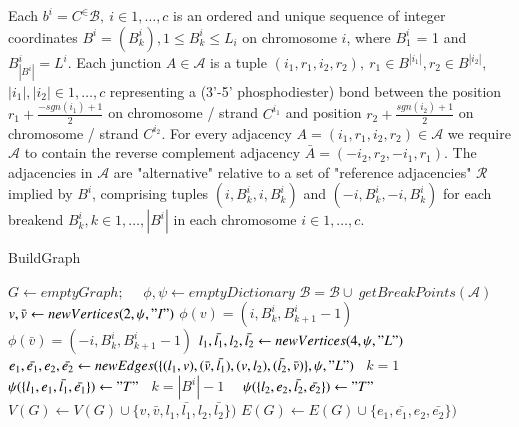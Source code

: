\documentclass[phd,tocprelim]{cornell}
\renewcommand{\caption}[1]{\singlespacing\hangcaption{#1}\normalspacing}
\begin{document}
Each $b^i = C^ \in \mathcal{B},\ i \in 1,\ldots,c$ is an ordered and unique sequence of integer coordinates $B^i = (B^i_k), 1 \le B^i_k \le L_i$ on chromosome $i$, where $B^i_1$ = 1 and $B^i_{|B^i|} = L^i$.  Each junction $A \in \mathcal{A}$ is a tuple $(i_1,r_1,i_2,r_2),\ r_1 \in B^{|i_1|}, r_2 \in B^{|i_2|}$, $|i_1|, |i_2| \in  1, \ldots, c$ representing a (3'-5' phosphodiester) bond between the position $r_1 + \frac{-sgn(i_1)+1}{2}$ on chromosome / strand $C^{i_1}$ and position $r_2+\frac{sgn(i_2)+1}{2}$ on chromosome / strand $C^{i_2}$.  For every adjacency $A = (i_1,r_1,i_2,r_2) \in \mathcal{A}$ we require $\mathcal{A}$ to contain the reverse complement adjacency $\bar{A} = (-i_2,r_2, -i_1,r_1)$. The adjacencies in $\mathcal{A}$ are "alternative" relative to a set of "reference adjacencies" $\mathcal{R}$ implied by $B^i$, comprising tuples $(i, B^i_k, i, B^i_k)$ and $(-i, B^i_k, -i, B^i_k)$ for each breakend $B^i_k, k\in 1,\dots,|B^i|$ in each chromosome $i \in 1,\ldots,c$.



\begin{algorithm}[h!] 
    \caption{BuildGraph} 
    \label{algo:buildgraph}  
    \begin{algorithmic}[1]
         
        \State $G \gets emptyGraph;\quad$ $\phi, \psi \gets emptyDictionary$
        \State $\mathcal{B} = \mathcal{B} \cup \ getBreakPoints(\mathcal{A})$ 
        \State $v, \bar{v} \gets newVertices(2, \psi, "I")$ 
        \State $\phi(v) = (i, B^i_k, B^i_{k+1}-1)$
        \State $\phi(\bar{v}) = (-i, B^i_k, B^i_{k+1}-1)$
        \State $l_1, \bar{l_1}, l_2, \bar{l_2} \gets newVertices(4, \psi, "L")$
        \State $e_1, \bar{e_1}, e_2, \bar{e_2} \gets newEdges(\{ (l_1, v), (\bar{v},\bar{l_1}), (v, l_2), (\bar{l_2},\bar{v}) \}, \psi, "L")$
        \State \algorithmicif\ $k = 1$ \ \algorithmicthen\ \ $\psi(\{l_1, e_1, \bar{l_1}, \bar{e_1} \}) \gets "T"$  
        \State \algorithmicif\ $k = |B^i|-1$ \ \algorithmicthen\ $\psi(\{l_2, e_2, \bar{l_2}, \bar{e_2} \}) \gets "T"$
        \State $V(G) \gets V(G) \cup  \{ v, \bar{v}, l_1, \bar{l_1}, l_2, \bar{l_2} \})$
        \State $E(G) \gets E(G) \cup  \{ e_1, \bar{e_1}, e_2, \bar{e_2} \})$
        \EndFor        
    \end{algorithmic}
\end{algorithm}
\end{document}
